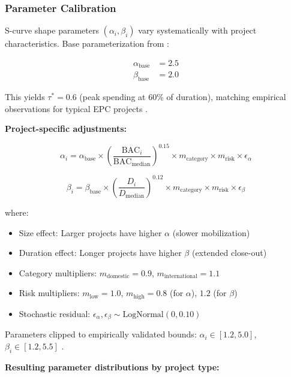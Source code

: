 \subsubsection{Parameter Calibration}

S-curve shape parameters $(\alpha_i, \beta_i)$ vary systematically with project characteristics. Base parameterization from \citet{cioffi2005tool}:

\begin{align}
\alpha_{\text{base}} &= 2.5 \\
\beta_{\text{base}} &= 2.0
\end{align}

This yields $\tau^* = 0.6$ (peak spending at 60\% of duration), matching empirical observations for typical EPC projects \citep{kenley1986construction}.

\textbf{Project-specific adjustments:}

\begin{equation}
\alpha_i = \alpha_{\text{base}} \times \left(\frac{\text{BAC}_i}{\text{BAC}_{\text{median}}}\right)^{0.15} \times m_{\text{category}} \times m_{\text{risk}} \times \epsilon_\alpha
\end{equation}

\begin{equation}
\beta_i = \beta_{\text{base}} \times \left(\frac{D_i}{D_{\text{median}}}\right)^{0.12} \times m_{\text{category}} \times m_{\text{risk}} \times \epsilon_\beta
\end{equation}

where:
\begin{itemize}
    \item Size effect: Larger projects have higher $\alpha$ (slower mobilization)
    \item Duration effect: Longer projects have higher $\beta$ (extended close-out)
    \item Category multipliers: $m_{\text{domestic}} = 0.9$, $m_{\text{international}} = 1.1$
    \item Risk multipliers: $m_{\text{low}} = 1.0$, $m_{\text{high}} = 0.8$ (for $\alpha$), $1.2$ (for $\beta$)
    \item Stochastic residual: $\epsilon_\alpha, \epsilon_\beta \sim \text{LogNormal}(0, 0.10)$
\end{itemize}

Parameters clipped to empirically validated bounds: $\alpha_i \in [1.2, 5.0]$, $\beta_i \in [1.2, 5.5]$ \citep{kenley1986construction}.

\textbf{Resulting parameter distributions by project type:}

